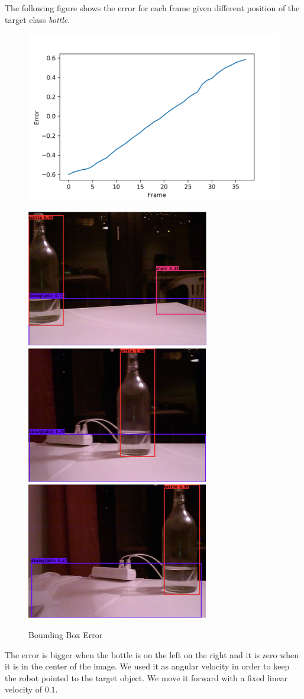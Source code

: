 \documentclass[letterpaper, 10 pt, conference]{ieeeconf}  %
\begin{document}
The following figure shows the error for each frame given different position of the target class \emph{bottle}.
\begin{figure}[H]
\begin{center}
	\includegraphics[width=\linewidth]{images/frame_error.png}
\end{center}	
\begin{center}
\includegraphics[width=0.25\linewidth]{images/bottle/1}	
\includegraphics[width=0.25\linewidth]{images/bottle/2}	
\includegraphics[width=0.25\linewidth]{images/bottle/3}		
\end{center}
\caption{Bounding Box Error}
\end{figure}
The error is bigger when the bottle is on the left on the right and it is zero when it is in the center of the image. We used it as angular velocity in order to keep the robot pointed to the target object. We move it forward with a fixed linear velocity of $0.1$. 
\end{document}
